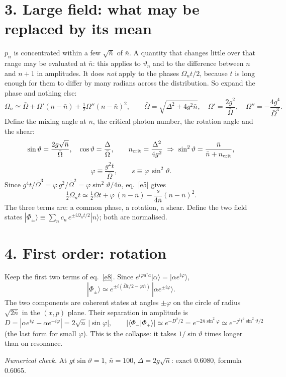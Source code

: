 \documentclass[11pt,letterpaper]{article}
\newcommand{\nbar}{\bar{n}}
\newcommand{\ncrit}{n_{\rm crit}}
\newcommand{\Obar}{\bar{\Omega}}
\newcommand{\ket}[1]{|#1\rangle}
\newcommand{\braket}[2]{\langle#1|#2\rangle}
\newcommand{\numcheck}[1]{\par{\small\textit{Numerical check.} #1}\par}
\begin{document}
\section*{3. Large field: what may be replaced by its mean}
$p_n$ is concentrated within a few $\sqrt{\nbar}$ of $\nbar$. A quantity that changes little over
that range may be evaluated at $\nbar$: this applies to $\vartheta_n$ and to the difference between
$n$ and $n+1$ in amplitudes. It does \emph{not} apply to the phases $\Omega_nt/2$, because $t$ is
long enough for them to differ by many radians across the distribution. So expand the phase and
nothing else:
\begin{equation}\label{e5}
\Omega_n\simeq\Obar+\Omega'(n-\nbar)+\tfrac12\Omega''(n-\nbar)^2,\qquad
\Obar=\sqrt{\Delta^2+4g^2\nbar},\quad \Omega'=\frac{2g^2}{\Obar},\quad \Omega''=-\frac{4g^4}{\Obar^3}.
\end{equation}
Define the mixing angle at $\nbar$, the critical photon number, the rotation angle and the shear:
\begin{equation}\label{e6}
\sin\vartheta=\frac{2g\sqrt{\nbar}}{\Obar},\quad\cos\vartheta=\frac{\Delta}{\Obar},\qquad
\ncrit=\frac{\Delta^2}{4g^2}\ \Rightarrow\ \sin^2\vartheta=\frac{\nbar}{\nbar+\ncrit},
\end{equation}
\begin{equation}\label{e7}
\varphi\equiv\frac{g^2t}{\Obar},\qquad s\equiv\varphi\,\sin^2\vartheta .
\end{equation}
Since $g^4t/\Obar^3=\varphi\,g^2/\Obar^2=\varphi\sin^2\vartheta/4\nbar$, eq.~\eqref{e5} gives
\begin{equation}\label{e8}
\tfrac12\Omega_nt\simeq\tfrac12\Obar t+\varphi\,(n-\nbar)-\frac{s}{4\nbar}(n-\nbar)^2 .
\end{equation}
The three terms are: a common phase, a rotation, a shear. Define the two field states
$\ket{\Phi_\pm}\equiv\sum_nc_n\,e^{\pm i\Omega_nt/2}\ket{n}$; both are normalised.

\section*{4. First order: rotation}
Keep the first two terms of eq.~\eqref{e8}. Since $e^{i\varphi a^\dagger a}\ket{\alpha}=\ket{\alpha e^{i\varphi}}$,
\begin{equation}\label{e9}
\ket{\Phi_\pm}\simeq e^{\pm i(\Obar t/2-\varphi\nbar)}\,\ket{\alpha e^{\pm i\varphi}} .
\end{equation}
The two components are coherent states at angles $\pm\varphi$ on the circle of radius
$\sqrt{2\nbar}$ in the $(x,p)$ plane. Their separation in amplitude is
\begin{equation}\label{e10}
D=|\alpha e^{i\varphi}-\alpha e^{-i\varphi}|=2\sqrt{\nbar}\,|\sin\varphi|,\qquad
|\braket{\Phi_-}{\Phi_+}|\simeq e^{-D^2/2}=e^{-2\nbar\sin^2\varphi}\simeq e^{-g^2t^2\sin^2\vartheta/2}
\end{equation}
(the last form for small $\varphi$). This is the collapse: it takes $1/\sin\vartheta$ times longer
than on resonance.
\numcheck{At $gt\sin\vartheta=1$, $\nbar=100$, $\Delta=2g\sqrt{\nbar}$: exact 0.6080, formula 0.6065.}
\end{document}

